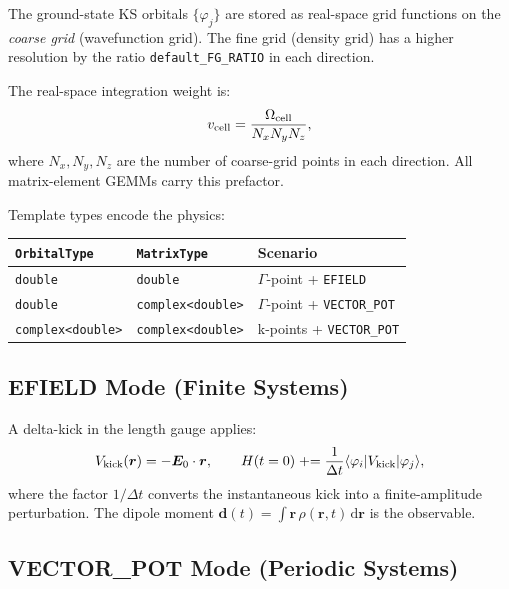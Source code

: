 \documentclass[12pt,letterpaper]{article}
\newcommand{\mel}[3]{\langle #1 \vert #2 \vert #3 \rangle}
\newcommand{\dd}{\mathrm{d}}
\begin{document}
The ground-state KS orbitals $\{\varphi_j\}$ are stored as real-space grid
functions on the \emph{coarse grid} (wavefunction grid).  The fine grid (density
grid) has a higher resolution by the ratio \texttt{default\_FG\_RATIO} in each
direction.

The real-space integration weight is:
\begin{equation}
  v_{\rm cell} = \frac{\Omega_{\rm cell}}{N_x N_y N_z},
\end{equation}
where $N_x, N_y, N_z$ are the number of coarse-grid points in each direction.
All matrix-element GEMMs carry this prefactor.

Template types encode the physics:
\begin{center}
\begin{tabular}{@{}lll@{}}
\toprule
\texttt{OrbitalType} & \texttt{MatrixType} & Scenario \\
\midrule
\texttt{double} & \texttt{double} & $\Gamma$-point + \texttt{EFIELD} \\
\texttt{double} & \texttt{complex<double>} & $\Gamma$-point + \texttt{VECTOR\_POT} \\
\texttt{complex<double>} & \texttt{complex<double>} & k-points + \texttt{VECTOR\_POT} \\
\bottomrule
\end{tabular}
\end{center}

\subsection{EFIELD Mode (Finite Systems)}
\label{sec:impl:efield}

A delta-kick in the length gauge applies:
\begin{equation}
  V_{\rm kick}(\bm{r}) = -\bm{E}_0\cdot\bm{r},
  \qquad
  H(t=0) \mathrel{+}= \frac{1}{\Delta t}\mel{\varphi_i}{V_{\rm kick}}{\varphi_j},
\end{equation}
where the factor $1/\Delta t$ converts the instantaneous kick into a
finite-amplitude perturbation.  The dipole moment
$\bm{d}(t) = \int\!\bm{r}\,\rho(\bm{r},t)\,\dd\bm{r}$ is the observable.

\subsection{VECTOR\_POT Mode (Periodic Systems)}
\label{sec:impl:vp}
\end{document}
